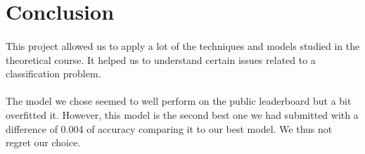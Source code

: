 \documentclass[a4paper, 11pt, oneside]{article}
\begin{document}
\section{Conclusion}

\paragraph{}This project allowed us to apply a lot of the techniques and models studied in the theoretical course. It helped us to understand certain issues related to a classification problem.
\paragraph{}The model we chose seemed to well perform on the public leaderboard but a bit overfitted it. However, this model is the second best one we had submitted with a difference of 0.004 of accuracy comparing it to our best model. We thus not regret our choice. 

\end{document}
